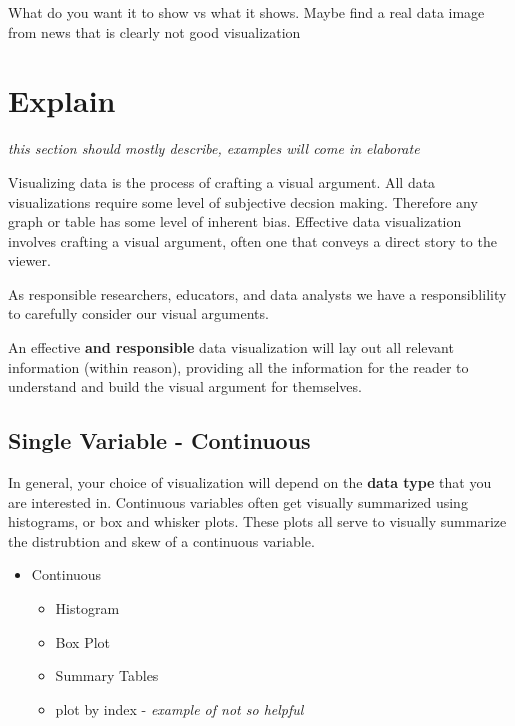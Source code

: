 \documentclass[
]{book}
\providecommand{\tightlist}{%
  \setlength{\itemsep}{0pt}\setlength{\parskip}{0pt}}
\begin{document}
What do you want it to show vs what it shows. Maybe find a real data image from news that is clearly not good visualization

\hypertarget{explain-1}{%
\section{Explain}\label{explain-1}}

\emph{this section should mostly describe, examples will come in elaborate}

Visualizing data is the process of crafting a visual argument. All data visualizations require some level of subjective decsion making. Therefore any graph or table has some level of inherent bias. Effective data visualization involves crafting a visual argument, often one that conveys a direct story to the viewer.

As responsible researchers, educators, and data analysts we have a responsiblility to carefully consider our visual arguments.

An effective \textbf{and responsible} data visualization will lay out all relevant information (within reason), providing all the information for the reader to understand and build the visual argument for themselves.

\hypertarget{single-variable---continuous}{%
\subsection{Single Variable - Continuous}\label{single-variable---continuous}}

In general, your choice of visualization will depend on the \textbf{data type} that you are interested in. Continuous variables often get visually summarized using histograms, or box and whisker plots. These plots all serve to visually summarize the distrubtion and skew of a continuous variable.

\begin{itemize}
\tightlist
\item
  Continuous

  \begin{itemize}
  \tightlist
  \item
    Histogram
  \item
    Box Plot
  \item
    Summary Tables
  \item
    plot by index - \emph{example of not so helpful}
  \end{itemize}
\end{itemize}
\end{document}
